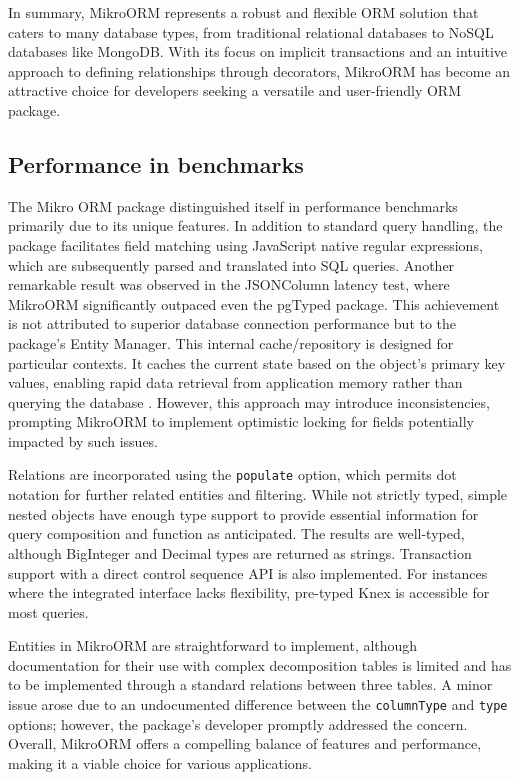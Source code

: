 In summary, MikroORM represents a robust and flexible ORM solution that caters
to many database types, from traditional relational databases to NoSQL databases
like MongoDB. With its focus on implicit transactions and an intuitive approach
to defining relationships through decorators, MikroORM has become an attractive
choice for developers seeking a versatile and user-friendly ORM package.

\subsection*{Performance in benchmarks}

The Mikro ORM package distinguished itself in performance benchmarks primarily
due to its unique features. In addition to standard query handling, the package
facilitates field matching using JavaScript native regular expressions, which
are subsequently parsed and translated into SQL queries. Another remarkable
result was observed in the JSONColumn latency test, where MikroORM significantly
outpaced even the pgTyped package. This achievement is not attributed to
superior database connection performance but to the package's Entity Manager.
This internal cache/repository is designed for particular contexts. It caches
the current state based on the object's primary key values, enabling rapid data
retrieval from application memory rather than querying the database
\cite{mikroORM-EM}. However, this approach may introduce inconsistencies,
prompting MikroORM to implement optimistic locking for fields potentially
impacted by such issues.

Relations are incorporated using the \texttt{populate} option, which permits dot
notation for further related entities and filtering. While not strictly typed,
simple nested objects have enough type support to provide essential information
for query composition and function as anticipated. The results are well-typed,
although BigInteger and Decimal types are returned as strings. Transaction
support with a direct control sequence API is also implemented. For instances
where the integrated interface lacks flexibility, pre-typed Knex is
accessible for most queries.

Entities in MikroORM are straightforward to implement, although documentation
for their use with complex decomposition tables is limited and has to be
implemented through a standard relations between three tables. A minor issue
arose due to an undocumented difference between the \texttt{columnType} and
\texttt{type} options; however, the package's developer promptly addressed the
concern. Overall, MikroORM offers a compelling balance of features and
performance, making it a viable choice for various applications.
